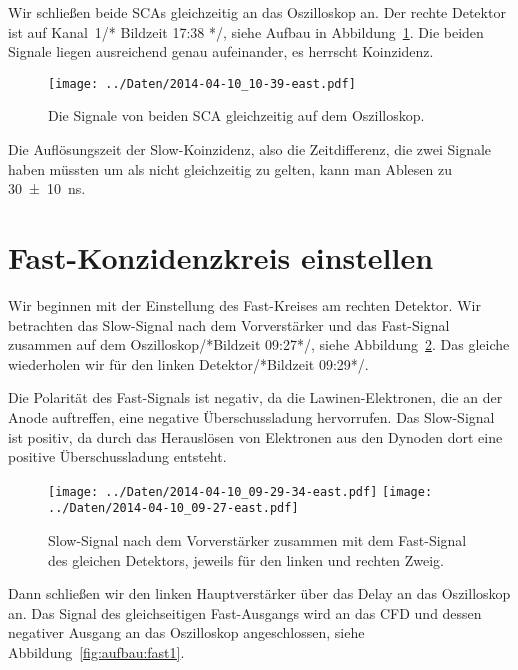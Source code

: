 Wir schließen beide SCAs gleichzeitig an das Oszilloskop an. Der rechte
Detektor ist auf Kanal~1/* Bildzeit 17:38 */, siehe Aufbau in
Abbildung~\ref{fig:beide_sca}. Die beiden Signale liegen ausreichend genau
aufeinander, es herrscht Koinzidenz.

\begin{figure}[htbp]
    \centering
    \texttt{[image: ../Daten/2014-04-10\_10-39-east.pdf]}
    \hfill
    \caption{%
        Die Signale von beiden SCA gleichzeitig auf dem Oszilloskop.
    }
    \label{fig:beide_sca}
\end{figure}

Die Auflösungszeit der Slow-Koinzidenz, also die Zeitdifferenz, die zwei
Signale haben müssten um als nicht gleichzeitig zu gelten, kann man Ablesen zu
\SI{30\pm10}{\nano\second}.

\section{Fast-Konzidenzkreis einstellen}

Wir beginnen mit der Einstellung des Fast-Kreises am rechten Detektor. Wir
betrachten das Slow-Signal nach dem Vorverstärker und das Fast-Signal zusammen
auf dem Oszilloskop/*Bildzeit 09:27*/, siehe
Abbildung~\ref{fig:fast_einstellen}. Das gleiche wiederholen wir für den linken
Detektor/*Bildzeit 09:29*/.

Die Polarität des Fast-Signals ist negativ, da die Lawinen-Elektronen, die an
der Anode auftreffen, eine negative Überschussladung hervorrufen. Das
Slow-Signal ist positiv, da durch das Herauslösen von Elektronen aus den
Dynoden dort eine positive Überschussladung entsteht.

\begin{figure}[htbp]
    \centering
    \texttt{[image: ../Daten/2014-04-10\_09-29-34-east.pdf]}
    \hfill
    \texttt{[image: ../Daten/2014-04-10\_09-27-east.pdf]}
    \caption{%
        Slow-Signal nach dem Vorverstärker zusammen mit dem Fast-Signal des
        gleichen Detektors, jeweils für den linken und rechten Zweig.
    }
    \label{fig:fast_einstellen}
\end{figure}

Dann schließen wir den linken Hauptverstärker über das Delay an das
Oszilloskop an. Das Signal des gleichseitigen Fast-Ausgangs wird an das CFD
und dessen negativer Ausgang an das Oszilloskop angeschlossen, siehe
Abbildung~\ref{fig:aufbau:fast1}.

